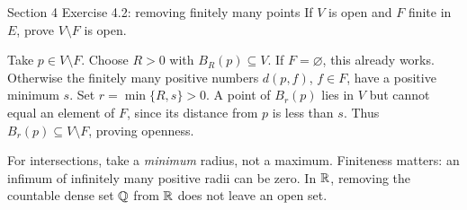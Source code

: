 \begin{exam}{Section 4 Exercise 4.2: removing finitely many points}
If $V$ is open and $F$ finite in $E$, prove $V\setminus F$ is open.
\end{exam}
\begin{answer}
Take $p\in V\setminus F$. Choose $R>0$ with $B_R(p)\subseteq V$. If $F=\varnothing$, this already works. Otherwise the finitely many positive numbers $d(p,f)$, $f\in F$, have a positive minimum $s$. Set $r=\min\{R,s\}>0$. A point of $B_r(p)$ lies in $V$ but cannot equal an element of $F$, since its distance from $p$ is less than $s$. Thus $B_r(p)\subseteq V\setminus F$, proving openness.
\end{answer}
\begin{tip}
For intersections, take a \emph{minimum} radius, not a maximum. Finiteness matters: an infimum of infinitely many positive radii can be zero. In $\mathbb R$, removing the countable dense set $\mathbb Q$ from $\mathbb R$ does not leave an open set.
\end{tip}


